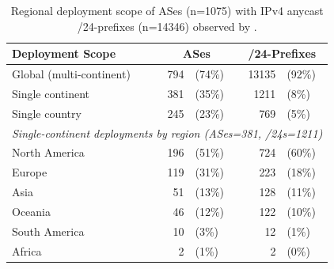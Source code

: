 \begin{table}[tb]
    \centering
    \caption{Regional deployment scope of ASes (n=\num{1075}) with IPv4 anycast /24-prefixes (n=\num{14346}) observed by \laces.}
    \begin{tabular}{l r@{~}l r@{~}l}
        \toprule
        Deployment Scope & \multicolumn{2}{c}{ASes} & \multicolumn{2}{c}{/24-Prefixes} \\
        \midrule
        Global (multi-continent)            & \num{794} & (74\%) & \num{13135} & (92\%) \\
        Single continent                    & \num{381} & (35\%) & \num{1211} & (8\%) \\
        \quad Single country                & \num{245} & (23\%) & \num{769} & (5\%) \\
        \midrule
        \multicolumn{5}{l}{\textit{Single-continent deployments by region (ASes=\num{381}, /24s=\num{1211})}} \\
        \midrule
        \quad North America                 & \num{196} & (51\%) & \num{724} & (60\%) \\
        \quad Europe                        & \num{119} & (31\%) & \num{223} & (18\%) \\
        \quad Asia                          & \num{51} & (13\%) & \num{128} & (11\%) \\
        \quad Oceania                       & \num{46} & (12\%) & \num{122} & (10\%) \\
        \quad South America                 & \num{10} & (3\%) & \num{12} & (1\%) \\
        \quad Africa                        & \num{2} & (1\%) & \num{2} & (0\%) \\

\end{tabular}
\end{table}
